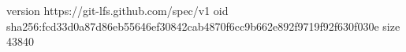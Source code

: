 version https://git-lfs.github.com/spec/v1
oid sha256:fcd33d0a87d86eb55646ef30842cab4870f6cc9b662e892f9719f92f630f030e
size 43840
